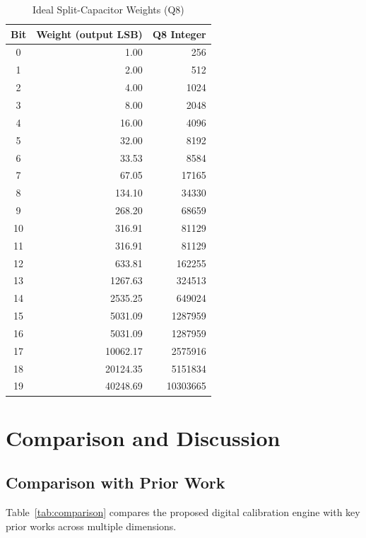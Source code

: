 \documentclass[journal]{IEEEtran}
\begin{document}
\begin{table}[!t]
\centering
\caption{Ideal Split-Capacitor Weights (Q8)}
\label{tab:split_weights}
\begin{tabular}{crr}
\toprule
Bit & Weight (output LSB) & Q8 Integer \\
\midrule
0 & 1.00 & 256 \\
1 & 2.00 & 512 \\
2 & 4.00 & 1024 \\
3 & 8.00 & 2048 \\
4 & 16.00 & 4096 \\
5 & 32.00 & 8192 \\
6 & 33.53 & 8584 \\
7 & 67.05 & 17165 \\
8 & 134.10 & 34330 \\
9 & 268.20 & 68659 \\
10 & 316.91 & 81129 \\
11 & 316.91 & 81129 \\
12 & 633.81 & 162255 \\
13 & 1267.63 & 324513 \\
14 & 2535.25 & 649024 \\
15 & 5031.09 & 1287959 \\
16 & 5031.09 & 1287959 \\
17 & 10062.17 & 2575916 \\
18 & 20124.35 & 5151834 \\
19 & 40248.69 & 10303665 \\
\bottomrule
\end{tabular}
\end{table}

\section{Comparison and Discussion}
\label{sec:comparison}

\subsection{Comparison with Prior Work}

Table~\ref{tab:comparison} compares the proposed digital calibration engine
with key prior works across multiple dimensions.
\end{document}
